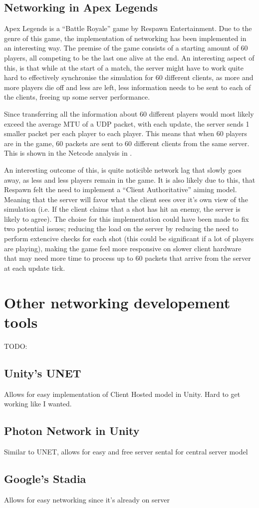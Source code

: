 \subsection{Networking in Apex Legends}
Apex Legends is a ``Battle Royale'' game by Respawn Entertainment. Due to the genre of this game, the implementation of networking has been implemented in an interesting way. The premise of the game consists of a starting amount of 60 players, all competing to be the last one alive at the end. An interesting aspect of this, is that while at the start of a match, the server might have to work quite hard to effectively synchronise the simulation for 60 different clients, as more and more players die off and less are left, less information needs to be sent to each of the clients, freeing up some server performance.

Since transferring all the information about 60 different players would most likely exceed the average MTU of a UDP packet, with each update, the server sends 1 smaller packet per each player to each player. This means that when 60 players are in the game, 60 packets are sent to 60 different clients from the same server. This is shown in the Netcode analysis in .

An interesting outcome of this, is quite noticible network lag that slowly goes away, as less and less players remain in the game. It is also likely due to this, that Respawn felt the need to implement a ``Client Authoritative'' aiming model. Meaning that the server will favor what the client sees over it's own view of the simulation (i.e. If the client claims that a shot has hit an enemy, the server is likely to agree). The choise for this implementation could have been made to fix two potential issues; reducing the load on the server by reducing the need to perform extencive checks for each shot (this could be significant if a lot of players are playing), making the game feel more responsive on slower client hardware that may need more time to process up to 60 packets that arrive from the server at each update tick.

\section{Other networking developement tools}
TODO:

\subsection{Unity's UNET}
Allows for easy implementation of Client Hosted model in Unity. Hard to get working like I wanted.


\subsection{Photon Network in Unity}
Similar to UNET, allows for easy and free server sental for central server model


\subsection{Google's Stadia}
Allows for easy networking since it's already on server
